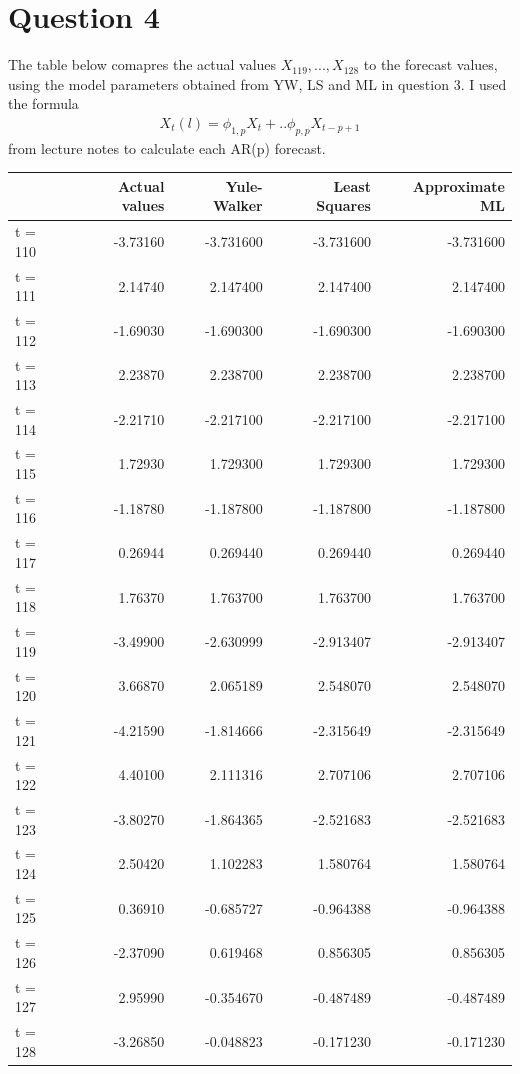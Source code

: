\documentclass[a4paper,10pt]{article}
\theoremstyle{mytheor}
\begin{document}
\section*{Question 4}

The table below comapres the actual values $X_119,...,  X_128$ to the forecast values, using the model parameters obtained from YW, LS and ML in question 3. I used the formula
\begin{align*}
    X_t(l) = \phi_{1,p}X_t + .. \phi_{p,p}X_{t-p+1}
\end{align*}
from lecture notes to calculate each AR(p) forecast. \\

\begin{tabular}{lrrrr}
\toprule
{} &  Actual values &  Yule-Walker &  Least Squares &   Approximate ML \\
\midrule
t = 110 & -3.73160 & -3.731600 & -3.731600 & -3.731600 \\
t = 111 &  2.14740 &  2.147400 &  2.147400 &  2.147400 \\
t = 112 & -1.69030 & -1.690300 & -1.690300 & -1.690300 \\
t = 113 &  2.23870 &  2.238700 &  2.238700 &  2.238700 \\
t = 114 & -2.21710 & -2.217100 & -2.217100 & -2.217100 \\
t = 115 &  1.72930 &  1.729300 &  1.729300 &  1.729300 \\
t = 116 & -1.18780 & -1.187800 & -1.187800 & -1.187800 \\
t = 117 &  0.26944 &  0.269440 &  0.269440 &  0.269440 \\
t = 118 &  1.76370 &  1.763700 &  1.763700 &  1.763700 \\
t = 119 & -3.49900 & -2.630999 & -2.913407 & -2.913407 \\
t = 120 &  3.66870 &  2.065189 &  2.548070 &  2.548070 \\
t = 121 & -4.21590 & -1.814666 & -2.315649 & -2.315649 \\
t = 122 &  4.40100 &  2.111316 &  2.707106 &  2.707106 \\
t = 123 & -3.80270 & -1.864365 & -2.521683 & -2.521683 \\
t = 124 &  2.50420 &  1.102283 &  1.580764 &  1.580764 \\
t = 125 &  0.36910 & -0.685727 & -0.964388 & -0.964388 \\
t = 126 & -2.37090 &  0.619468 &  0.856305 &  0.856305 \\
t = 127 &  2.95990 & -0.354670 & -0.487489 & -0.487489 \\
t = 128 & -3.26850 & -0.048823 & -0.171230 & -0.171230 \\
\bottomrule
\end{tabular} \\
\end{document}

